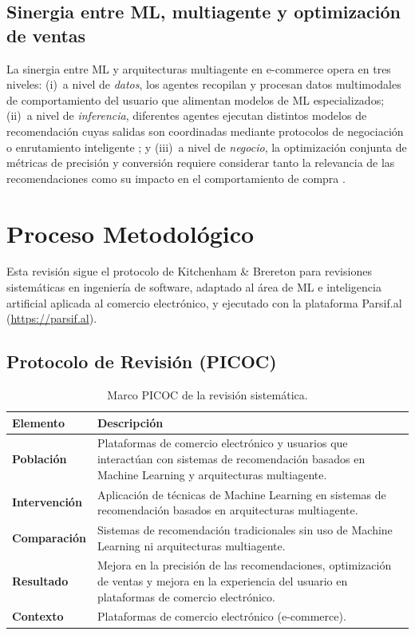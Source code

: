 \documentclass[12pt, a4paper]{article}
\begin{document}
\subsection{Sinergia entre ML, multiagente y optimizaci\'on de ventas}

La sinergia entre ML y arquitecturas multiagente en e-commerce opera en tres
niveles: (i)~a nivel de \textit{datos}, los agentes recopilan y procesan datos
multimodales de comportamiento del usuario que alimentan modelos de ML
especializados; (ii)~a nivel de \textit{inferencia}, diferentes agentes ejecutan
distintos modelos de recomendaci\'on cuyas salidas son coordinadas mediante
protocolos de negociaci\'on o enrutamiento inteligente \cite{Alhejaili2021,
Bai2025}; y (iii)~a nivel de \textit{negocio}, la optimizaci\'on conjunta de
m\'etricas de precisi\'on y conversi\'on requiere considerar tanto la relevancia
de las recomendaciones como su impacto en el comportamiento de compra
\cite{Girish2025, Ding2025, LiYuetong2025}.

\section{Proceso Metodol\'ogico}

Esta revisi\'on sigue el protocolo de Kitchenham \& Brereton
\cite{Kitchenham2007} para revisiones sistem\'aticas en ingenier\'ia de
software, adaptado al \'area de ML e inteligencia artificial aplicada al
comercio electr\'onico, y ejecutado con la plataforma Parsif.al
(\url{https://parsif.al}).

\subsection{Protocolo de Revisi\'on (PICOC)}

\begin{table}[H]
\centering
\caption{Marco PICOC de la revisi\'on sistem\'atica.}
\label{tab:picoc}
\begin{tabularx}{\linewidth}{>{\bfseries}lX}
\toprule
Elemento & Descripci\'on \\
\midrule
Poblaci\'on &
  Plataformas de comercio electr\'onico y usuarios que interact\'uan con
  sistemas de recomendaci\'on basados en Machine Learning y arquitecturas
  multiagente. \\
Intervenci\'on &
  Aplicaci\'on de t\'ecnicas de Machine Learning en sistemas de
  recomendaci\'on basados en arquitecturas multiagente. \\
Comparaci\'on &
  Sistemas de recomendaci\'on tradicionales sin uso de Machine Learning
  ni arquitecturas multiagente. \\
Resultado &
  Mejora en la precisi\'on de las recomendaciones, optimizaci\'on de
  ventas y mejora en la experiencia del usuario en plataformas de
  comercio electr\'onico. \\
Contexto &
  Plataformas de comercio electr\'onico (e-commerce). \\
\bottomrule
\end{tabularx}
\end{table}
\end{document}
